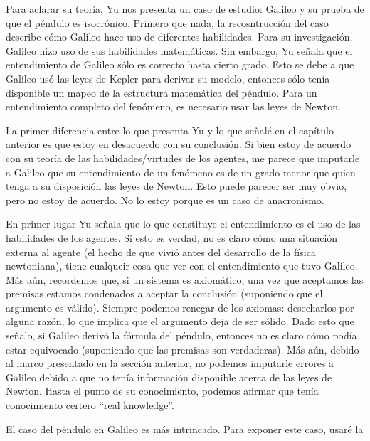 Para aclarar su teoría, Yu nos presenta un caso de estudio: Galileo y su prueba de que el péndulo es isocrónico. Primero que nada, la recosntrucción del caso describe cómo Galileo hace uso de diferentes habilidades. Para su investigación, Galileo hizo uso de sus habilidades matemáticas. Sin embargo, Yu señala que el entendimiento de Galileo sólo es correcto hasta cierto grado. Esto se debe a que Galileo usó las leyes de Kepler para derivar su modelo, entonces sólo tenía disponible un mapeo de la estructura matemática del péndulo. Para un entendimiento completo del fenómeno, es necesario usar las leyes de Newton.

La primer diferencia entre lo que presenta Yu y lo que señalé en el capítulo anterior es que estoy en desacuerdo con su conclusión. Si bien estoy de acuerdo con su teoría de las habilidades/virtudes de los agentes, me parece que imputarle a Galileo que su entendimiento de un fenómeno es de un grado menor que quien tenga a su disposición las leyes de Newton. Esto puede parecer ser muy obvio, pero no estoy de acuerdo. No lo estoy porque es un caso de anacronismo.

En primer lugar Yu señala que lo que constituye el entendimiento es el uso de las habilidades de los agentes. Si esto es verdad, no es claro cómo una situación externa al agente (el hecho de que vivió antes del desarrollo de la física newtoniana), tiene cualqueir cosa que ver con el entendimiento que tuvo Galileo. Más aún, recordemos que, si un sistema es axiomático, una vez que aceptamos las premisas estamos condenados a aceptar la conclusión (suponiendo que el argumento es válido). Siempre podemos renegar de los axiomas: desecharlos por alguna razón, lo que implica que el argumento deja de ser sólido. Dado esto que señalo, si Galileo derivó la fórmula del péndulo, entonces no es claro cómo podía estar equivocado (suponiendo que las premisas son verdaderas). Más aún, debido al marco presentado en la sección anterior, no podemos imputarle errores a Galileo debido a que no tenía información disponible acerca de las leyes de Newton. Hasta el punto de su conocimiento, podemos afirmar que tenía conocimiento certero ``real knowledge''.

El caso del péndulo en Galileo es más intrincado. Para exponer este caso, usaré la %

